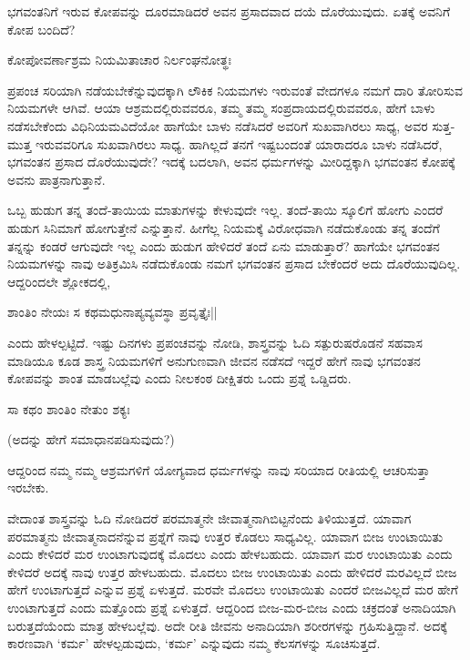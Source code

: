 ಭಗವಂತನಿಗೆ ಇರುವ ಕೋಪವನ್ನು ದೂರಮಾಡಿದರೆ ಅವನ ಪ್ರಸಾದವಾದ ದಯೆ ದೊರೆಯುವುದು. ಏತಕ್ಕೆ ಅವನಿಗೆ ಕೋಪ ಬಂದಿದೆ?

\begin{shloka}
ಕೋಪೋವರ್ಣಾಶ್ರಮ ನಿಯಮಿತಾಚಾರ ನಿರ್ಲಂಘನೋತ್ಥಃ
\end{shloka}

ಪ್ರಪಂಚ ಸರಿಯಾಗಿ ನಡೆಯಬೇಕೆನ್ನುವುದಕ್ಕಾಗಿ ಲೌಕಿಕ ನಿಯಮಗಳು ಇರುವಂತೆ ವೇದಗಳೂ ನಮಗೆ ದಾರಿ ತೋರಿಸುವ ನಿಯಮಗಳೇ ಆಗಿವೆ. ಆಯಾ ಆಶ್ರಮದಲ್ಲಿರುವವರೂ, ತಮ್ಮ ತಮ್ಮ ಸಂಪ್ರದಾಯದಲ್ಲಿರುವವರೂ, ಹೇಗೆ ಬಾಳು ನಡೆಸಬೇಕೆಂದು ವಿಧಿನಿಯಮವಿದೆಯೋ ಹಾಗೆಯೇ ಬಾಳು ನಡೆಸಿದರೆ ಅವರಿಗೆ ಸುಖವಾಗಿರಲು ಸಾಧ್ಯ, ಅವರ ಸುತ್ತ-ಮುತ್ತ ಇರುವವರಿಗೂ ಸುಖವಾಗಿರಲು ಸಾಧ್ಯ. ಹಾಗಿಲ್ಲದೆ ತನಗೆ ಇಷ್ಟಬಂದಂತೆ ಯಾರಾದರೂ ಬಾಳು ನಡೆಸಿದರೆ, ಭಗವಂತನ ಪ್ರಸಾದ ದೊರೆಯುವುದೇ? ಇದಕ್ಕೆ ಬದಲಾಗಿ, ಅವನ ಧರ್ಮಗಳನ್ನು ಮೀರಿದ್ದಕ್ಕಾಗಿ ಭಗವಂತನ ಕೋಪಕ್ಕೆ ಅವನು ಪಾತ್ರನಾಗುತ್ತಾನೆ.

ಒಬ್ಬ ಹುಡುಗ ತನ್ನ ತಂದೆ-ತಾಯಿಯ ಮಾತುಗಳನ್ನು ಕೇಳುವುದೇ ಇಲ್ಲ. ತಂದೆ-ತಾಯಿ ಸ್ಕೂಲಿಗೆ ಹೋಗು ಎಂದರೆ ಹುಡುಗ ಸಿನಿಮಾಗೆ ಹೋಗುತ್ತೇನೆ ಎನ್ನುತ್ತಾನೆ. ಹೀಗೆಲ್ಲ ನಿಯಮಕ್ಕೆ ವಿರೋಧವಾಗಿ ನಡೆದುಕೊಂಡು ತನ್ನ ತಂದೆಗೆ ತನ್ನನ್ನು ಕಂಡರೆ ಆಗುವುದೇ ಇಲ್ಲ ಎಂದು ಹುಡುಗ ಹೇಳಿದರೆ ತಂದೆ ಏನು ಮಾಡುತ್ತಾರೆ? ಹಾಗೆಯೇ ಭಗವಂತನ ನಿಯಮಗಳನ್ನು ನಾವು ಅತಿಕ್ರಮಿಸಿ ನಡೆದುಕೊಂಡು ನಮಗೆ ಭಗವಂತನ ಪ್ರಸಾದ ಬೇಕೆಂದರೆ ಅದು ದೊರೆಯುವುದಿಲ್ಲ. ಆದ್ದರಿಂದಲೇ ಶ್ಲೋಕದಲ್ಲಿ,

\begin{shloka}
ಶಾಂತಿಂ ನೇಯಃ ಸ ಕಥಮಧುನಾಪ್ಯವ್ಯವಸ್ಥಾ ಪ್ರವೃತ್ತೈಃ||
\end{shloka}

ಎಂದು ಹೇಳಲ್ಪಟ್ಟಿದೆ. ಇಷ್ಟು ದಿನಗಳು ಪ್ರಪಂಚವನ್ನು ನೋಡಿ, ಶಾಸ್ತ್ರವನ್ನು ಓದಿ ಸತ್ಪುರುಷರೊಡನೆ ಸಹವಾಸ ಮಾಡಿಯೂ ಕೂಡ ಶಾಸ್ತ್ರ ನಿಯಮಗಳಿಗೆ ಅನುಗುಣವಾಗಿ ಜೀವನ ನಡೆಸದೆ ಇದ್ದರೆ ಹೇಗೆ ನಾವು ಭಗವಂತನ ಕೋಪವನ್ನು ಶಾಂತ ಮಾಡಬಲ್ಲೆವು ಎಂದು ನೀಲಕಂಠ ದೀಕ್ಷಿತರು ಒಂದು ಪ್ರಶ್ನೆ ಒಡ್ಡಿದರು.

\begin{shloka}
ಸಾ ಕಥಂ ಶಾಂತಿಂ ನೇತುಂ ಶಕ್ಯಃ
\end{shloka}

(ಅದನ್ನು ಹೇಗೆ ಸಮಾಧಾನಪಡಿಸುವುದು?)

ಆದ್ದರಿಂದ ನಮ್ಮ ನಮ್ಮ ಆಶ್ರಮಗಳಿಗೆ ಯೋಗ್ಯವಾದ ಧರ್ಮಗಳನ್ನು ನಾವು ಸರಿಯಾದ ರೀತಿಯಲ್ಲಿ ಆಚರಿಸುತ್ತಾ ಇರಬೇಕು.

ವೇದಾಂತ ಶಾಸ್ತ್ರವನ್ನು ಓದಿ ನೋಡಿದರೆ ಪರಮಾತ್ಮನೇ ಜೀವಾತ್ಮನಾಗಿಬಿಟ್ಟನೆಂದು ತಿಳಿಯುತ್ತದೆ. ಯಾವಾಗ ಪರಮಾತ್ಮನು ಜೀವಾತ್ಮನಾದನೆನ್ನುವ ಪ್ರಶ್ನೆಗೆ ನಾವು ಉತ್ತರ ಕೊಡಲು ಸಾಧ್ಯವಿಲ್ಲ. ಯಾವಾಗ ಬೀಜ ಉಂಟಾಯಿತು ಎಂದು ಕೇಳಿದರೆ ಮರ ಉಂಟಾಗುವುದಕ್ಕೆ ಮೊದಲು ಎಂದು ಹೇಳಬಹುದು. ಯಾವಾಗ ಮರ ಉಂಟಾಯಿತು ಎಂದು ಕೇಳಿದರೆ ಅದಕ್ಕೆ ನಾವು ಉತ್ತರ ಹೇಳಬಹುದು. ಮೊದಲು ಬೀಜ ಉಂಟಾಯಿತು ಎಂದು ಹೇಳಿದರೆ ಮರವಿಲ್ಲದೆ ಬೀಜ ಹೇಗೆ ಉಂಟಾಗುತ್ತದೆ ಎನ್ನುವ ಪ್ರಶ್ನೆ ಏಳುತ್ತದೆ. ಮರವೇ ಮೊದಲು ಉಂಟಾಯಿತು ಎಂದರೆ ಬೀಜವಿಲ್ಲದೆ ಮರ ಹೇಗೆ ಉಂಟಾಗುತ್ತದೆ ಎಂದು ಮತ್ತೊಂದು ಪ್ರಶ್ನೆ ಏಳುತ್ತದೆ. ಆದ್ದರಿಂದ ಬೀಜ-ಮರ-ಬೀಜ ಎಂದು ಚಕ್ರದಂತೆ ಅನಾದಿಯಾಗಿ ಬರುತ್ತದೆಯೆಂದು ಮಾತ್ರ ಹೇಳಬಲ್ಲೆವು. ಅದೇ ರೀತಿ ಜೀವನು ಅನಾದಿಯಾಗಿ ಶರೀರಗಳನ್ನು ಗ್ರಹಿಸುತ್ತಿದ್ದಾನೆ. ಅದಕ್ಕೆ ಕಾರಣವಾಗಿ `ಕರ್ಮ' ಹೇಳಲ್ಪಡುವುದು, `ಕರ್ಮ' ಎನ್ನುವುದು ನಮ್ಮ ಕೆಲಸಗಳನ್ನು ಸೂಚಿಸುತ್ತದೆ.

